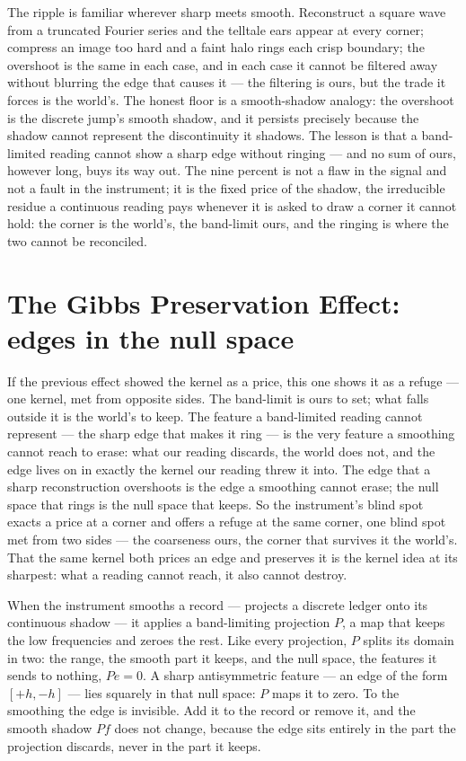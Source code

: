 The ripple is familiar wherever sharp meets smooth. Reconstruct a square wave from a truncated Fourier series
and the telltale ears appear at every corner; compress an image too hard and a faint halo rings each crisp
boundary; the overshoot is the same in each case, and in each case it cannot be filtered away without blurring
the edge that causes it --- the filtering is ours, but the trade it forces is the world's. The honest floor is
a smooth-shadow analogy: the overshoot is the discrete jump's smooth shadow, and it persists precisely because
the shadow cannot represent the discontinuity it shadows. The lesson is that a band-limited reading cannot show
a sharp edge without ringing --- and no sum of ours, however long, buys its way out. The nine percent is not a
flaw in the signal and not a fault in the instrument; it is the fixed price of the shadow, the irreducible
residue a continuous reading pays whenever it is asked to draw a corner it cannot hold: the corner is the
world's, the band-limit ours, and the ringing is where the two cannot be reconciled.

\section{The Gibbs Preservation Effect: edges in the null space}
\label{se:gibbs-preservation}

If the previous effect showed the kernel as a price, this one shows it as a refuge --- one kernel, met from
opposite sides. The band-limit is ours to set; what falls outside it is the world's to keep. The feature a
band-limited reading cannot represent --- the sharp edge that makes it ring --- is the very feature a smoothing
cannot reach to erase: what our reading discards, the world does not, and the edge lives on in exactly the
kernel our reading threw it into. The edge that a sharp reconstruction overshoots is the edge a smoothing
cannot erase; the null space that rings is the null space that keeps. So the instrument's blind spot exacts a
price at a corner and offers a refuge at the same corner, one blind spot met from two sides --- the coarseness
ours, the corner that survives it the world's. That the same kernel both prices an edge and preserves it is the
kernel idea at its sharpest: what a reading cannot reach, it also cannot destroy.

When the instrument smooths a record --- projects a discrete ledger onto its continuous shadow --- it applies a
band-limiting projection $P$, a map that keeps the low frequencies and zeroes the rest. Like every projection,
$P$ splits its domain in two: the range, the smooth part it keeps, and the null space, the features it sends to
nothing, $P e = 0$. A sharp antisymmetric feature --- an edge of the form $[+h, -h]$ --- lies squarely in that
null space: $P$ maps it to zero. To the smoothing the edge is invisible. Add it to the record or remove it, and
the smooth shadow $P f$ does not change, because the edge sits entirely in the part the projection discards,
never in the part it keeps.

